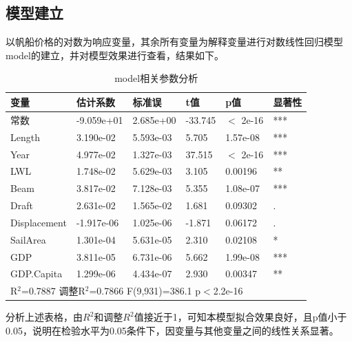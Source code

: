 \documentclass[a4paper,12pt,onecolumn,oneside]{article}
\begin{document}
\subsection{模型建立}
以帆船价格的对数为响应变量，其余所有变量为解释变量进行对数线性回归模型model的建立，并对模型效果进行查看，结果如下。
\begin{table}[htbp]
	\centering
	\caption{model相关参数分析}\vspace{0.5\baselineskip}
	\begin{tabular}{llllll}
		\toprule
		变量 & 估计系数 & 标准误 & t值 & p值 & 显著性 \\
		\midrule
		常数 & -9.059e+01 & 2.685e+00 & -33.745 & $<$ 2e-16 & *** \\
		Length & 3.190e-02 & 5.593e-03 & 5.705 & 1.57e-08 & *** \\
		Year & 4.977e-02 & 1.327e-03 & 37.515 & $<$ 2e-16 & *** \\
		LWL & 1.748e-02 & 5.629e-03 & 3.105 & 0.00196 & ** \\
		Beam & 3.817e-02 & 7.128e-03 & 5.355 & 1.08e-07 & *** \\
		Draft & 2.631e-02 & 1.565e-02 & 1.681 & 0.09302 & . \\
		Displacement & -1.917e-06 & 1.025e-06 & -1.871 & 0.06172 & . \\
		SailArea & 1.301e-04 & 5.631e-05 & 2.310 & 0.02108 & * \\
		GDP & 3.811e-05 & 6.731e-06 & 5.662 & 1.99e-08 & *** \\
		GDP.Capita & 1.299e-06 & 4.434e-07 & 2.930 & 0.00347 & ** \\
		\midrule
		\multicolumn{6}{l}{R$^2$=0.7887 调整R$^2$=0.7866 F(9,931)=386.1 p$<$2.2e-16} \\
		\bottomrule
	\end{tabular}%
	\label{tab:addlabel}%
\end{table}
分析上述表格，由$R^2$和调整$R^2$值接近于1，可知本模型拟合效果良好，且p值小于0.05，说明在检验水平为0.05条件下，因变量与其他变量之间的线性关系显著。
\end{document}
